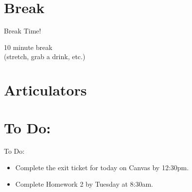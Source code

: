 \documentclass[professionalfonts]{beamer}
\begin{document}
\section*{Break}

\begin{frame}{Break Time!}
    \begin{center}
        \Huge 10 minute break \\ (stretch, grab a drink, etc.)
    \end{center}
\end{frame}

\section*{Articulators}



\section*{To Do:}
\begin{frame}{To Do:}
    \begin{itemize}
        \item Complete the exit ticket for today on Canvas by 12:30pm.
        \item Complete Homework 2 by Tuesday at 8:30am.
    \end{itemize}
\end{frame}

\end{document}
